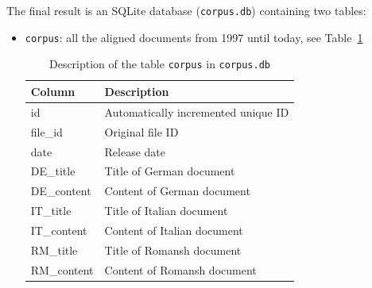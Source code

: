 The final result is an SQLite database (\texttt{corpus.db}) containing two tables:
\begin{itemize}
	\item \texttt{corpus}: all the aligned documents from 1997 until today, see Table~\ref{tab:corpus.db-corpus}


	\begin{table}
	\centering
	\begin{tabular}{ll}
	\toprule
	Column & Description \\
	\midrule
	id & Automatically incremented unique ID \\
	file\_id & Original file ID \\
	date&  Release date \\
	DE\_title &  Title of German document \\
	DE\_content &  Content of German document \\
	IT\_title &  Title of Italian document \\
	IT\_content &  Content of Italian document \\
	RM\_title &  Title of Romansh document \\
	RM\_content &  Content of Romansh document \\
	\bottomrule
	\end{tabular}
	\caption{Description of the table \texttt{corpus} in \texttt{corpus.db}}
	\label{tab:corpus.db-corpus}
	\end{table}


\end{itemize}
